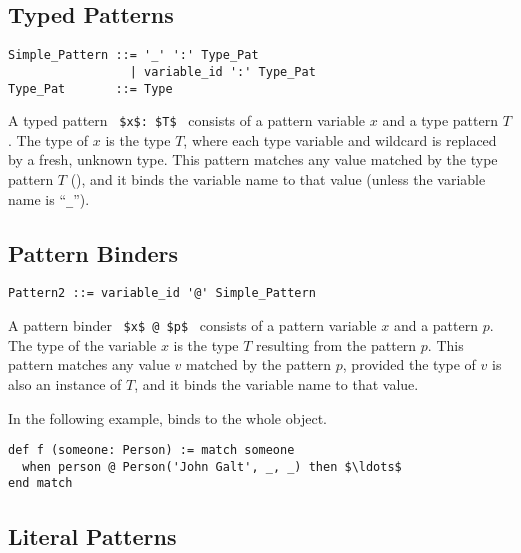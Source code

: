 \subsection{Typed Patterns}
\label{sec:typed-patterns}

\syntax\begin{lstlisting}
Simple_Pattern ::= '_' ':' Type_Pat
                 | variable_id ':' Type_Pat
Type_Pat       ::= Type
\end{lstlisting}

A typed pattern ~\lstinline!$x$: $T$!~ consists of a pattern variable $x$ and a type pattern $T$. The type of $x$ is the type $T$, where each type variable and wildcard is replaced by a fresh, unknown type. This pattern matches any value matched by the type pattern $T$ (), and it binds the variable name to that value (unless the variable name is ``\lstinline!_!''). 






\subsection{Pattern Binders}
\label{sec:pattern-binders}

\syntax\begin{lstlisting}
Pattern2 ::= variable_id '@' Simple_Pattern
\end{lstlisting}

A pattern binder ~\lstinline!$x$ @ $p$!~ consists of a pattern variable $x$ and a pattern $p$. The type of the variable $x$ is the type $T$ resulting from the pattern $p$. This pattern matches any value $v$ matched by the pattern $p$, provided the type of $v$ is also an instance of $T$, and it binds the variable name to that value. 

\example In the following example,  binds to the whole  object. 
\begin{lstlisting}
def f (someone: Person) := match someone
  when person @ Person('John Galt', _, _) then $\ldots$
end match
\end{lstlisting}







\subsection{Literal Patterns}
\label{sec:literal-patterns}

